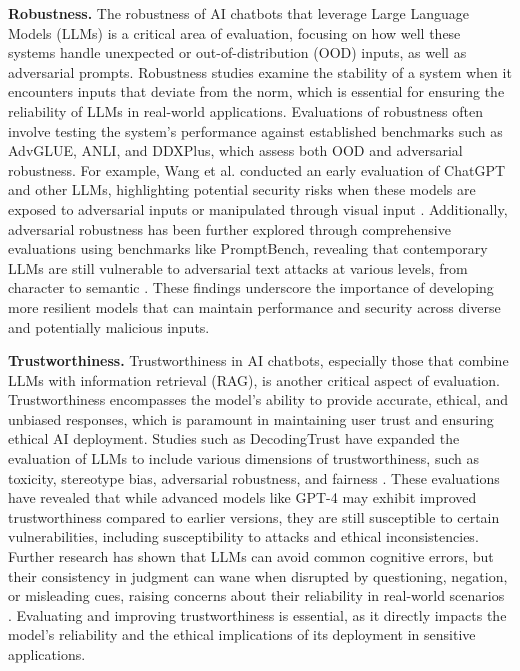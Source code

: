\textbf{Robustness.} The robustness of AI chatbots that leverage Large Language Models (LLMs) is a critical area of evaluation, focusing on how well these systems handle unexpected or out-of-distribution (OOD) inputs, as well as adversarial prompts. Robustness studies examine the stability of a system when it encounters inputs that deviate from the norm, which is essential for ensuring the reliability of LLMs in real-world applications. Evaluations of robustness often involve testing the system's performance against established benchmarks such as AdvGLUE, ANLI, and DDXPlus, which assess both OOD and adversarial robustness. For example, Wang et al. conducted an early evaluation of ChatGPT and other LLMs, highlighting potential security risks when these models are exposed to adversarial inputs or manipulated through visual input \cite{zhu2023robustness}. Additionally, adversarial robustness has been further explored through comprehensive evaluations using benchmarks like PromptBench, revealing that contemporary LLMs are still vulnerable to adversarial text attacks at various levels, from character to semantic \cite{wang2023robustness}. These findings underscore the importance of developing more resilient models that can maintain performance and security across diverse and potentially malicious inputs.

\textbf{Trustworthiness.} Trustworthiness in AI chatbots, especially those that combine LLMs with information retrieval (RAG), is another critical aspect of evaluation. Trustworthiness encompasses the model's ability to provide accurate, ethical, and unbiased responses, which is paramount in maintaining user trust and ensuring ethical AI deployment. Studies such as DecodingTrust have expanded the evaluation of LLMs to include various dimensions of trustworthiness, such as toxicity, stereotype bias, adversarial robustness, and fairness \cite{wang2023decodingtrust}. These evaluations have revealed that while advanced models like GPT-4 may exhibit improved trustworthiness compared to earlier versions, they are still susceptible to certain vulnerabilities, including susceptibility to attacks and ethical inconsistencies. Further research has shown that LLMs can avoid common cognitive errors, but their consistency in judgment can wane when disrupted by questioning, negation, or misleading cues, raising concerns about their reliability in real-world scenarios \cite{hagendorff2023trustworthiness}. Evaluating and improving trustworthiness is essential, as it directly impacts the model's reliability and the ethical implications of its deployment in sensitive applications.

